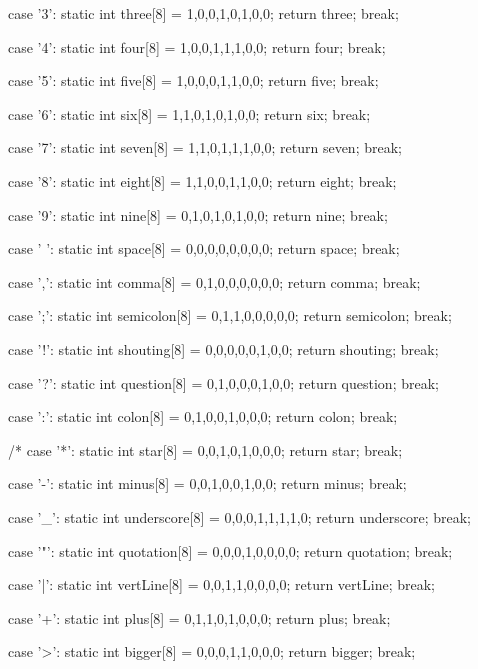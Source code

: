 {{    case '3':
    static int three[8] = {1,0,0,1,0,1,0,0};
    return three;
    break;
  
    case '4':
    static int four[8] = {1,0,0,1,1,1,0,0};
    return four;
    break;
  
    case '5':
    static int five[8] = {1,0,0,0,1,1,0,0};
    return five;
    break;
  
    case '6':
    static int six[8] = {1,1,0,1,0,1,0,0};
    return six;
    break;
  
    case '7':
    static int seven[8] = {1,1,0,1,1,1,0,0};
    return seven;
    break;
  
    case '8':
    static int eight[8] = {1,1,0,0,1,1,0,0};
    return eight;
    break;
  
    case '9':
    static int nine[8] = {0,1,0,1,0,1,0,0};
    return nine;
    break;

    case ' ':
    static int space[8] = {0,0,0,0,0,0,0,0};
    return space;
    break;

    case ',':
    static int comma[8] = {0,1,0,0,0,0,0,0};
    return comma;
    break;

    case ';':
    static int semicolon[8] = {0,1,1,0,0,0,0,0};
    return semicolon;
    break;

    case '!':
    static int shouting[8] = {0,0,0,0,0,1,0,0};
    return shouting;
    break;

    case '?':
    static int question[8] = {0,1,0,0,0,1,0,0};
    return question;
    break;

    case ':':
    static int colon[8] = {0,1,0,0,1,0,0,0};
    return colon;
    break;

   /* case '*':
    static int star[8] = {0,0,1,0,1,0,0,0};
    return star;
    break;

    case '-':
    static int minus[8] = {0,0,1,0,0,1,0,0};
    return minus;
    break;

    case '_':
    static int underscore[8] = {0,0,0,1,1,1,1,0};
    return underscore;
    break;

    case '"':
    static int quotation[8] = {0,0,0,1,0,0,0,0};
    return quotation;
    break;
    

    case '|':
    static int vertLine[8] = {0,0,1,1,0,0,0,0};
    return vertLine;
    break;

    case '+':
    static int plus[8] = {0,1,1,0,1,0,0,0};
    return plus;
    break;

    case '>':
    static int bigger[8] = {0,0,0,1,1,0,0,0};
    return bigger;
    break;

}}
